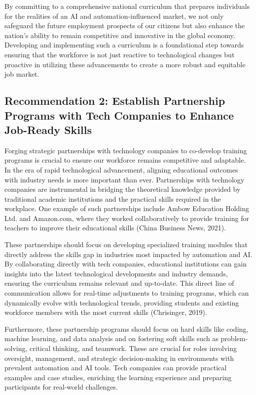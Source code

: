 \documentclass[11pt]{article}
\begin{document}
By committing to a comprehensive national curriculum that prepares individuals for the realities of an AI and automation-influenced market, we not only safeguard the future employment prospects of our citizens but also enhance the nation's ability to remain competitive and innovative in the global economy. Developing and implementing such a curriculum is a foundational step towards ensuring that the workforce is not just reactive to technological changes but proactive in utilizing these advancements to create a more robust and equitable job market.

\subsection{Recommendation 2: Establish Partnership Programs with Tech Companies to Enhance Job-Ready Skills}

Forging strategic partnerships with technology companies to co-develop training programs is crucial to ensure our workforce remains competitive and adaptable. In the era of rapid technological advancement, aligning educational outcomes with industry needs is more important than ever. Partnerships with technology companies are instrumental in bridging the theoretical knowledge provided by traditional academic institutions and the practical skills required in the workplace. One example of such partnerships include Ambow Education Holding Ltd. and Amazon.com, where they worked collaboratively to provide training for teachers to improve their educational skills (China Business News, 2021).

These partnerships should focus on developing specialized training modules that directly address the skills gap in industries most impacted by automation and AI. By collaborating directly with tech companies, educational institutions can gain insights into the latest technological developments and industry demands, ensuring the curriculum remains relevant and up-to-date. This direct line of communication allows for real-time adjustments to training programs, which can dynamically evolve with technological trends, providing students and existing workforce members with the most current skills (Chrisinger, 2019).

Furthermore, these partnership programs should focus on hard skills like coding, machine learning, and data analysis and on fostering soft skills such as problem-solving, critical thinking, and teamwork. These are crucial for roles involving oversight, management, and strategic decision-making in environments with prevalent automation and AI tools. Tech companies can provide practical examples and case studies, enriching the learning experience and preparing participants for real-world challenges.
\end{document}
